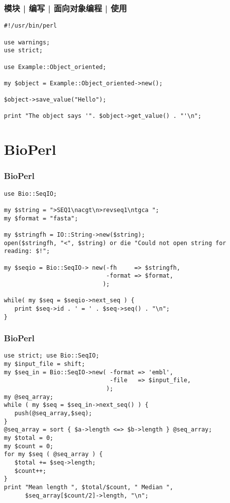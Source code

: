 \begin{frame}[fragile]
  \frametitle{模块 | 编写 | 面向对象编程 | 使用}
\begin{lstlisting}
#!/usr/bin/perl

use warnings;
use strict;

use Example::Object_oriented;

my $object = Example::Object_oriented->new();

$object->save_value("Hello");

print "The object says '". $object->get_value() . "'\n";
\end{lstlisting}
\end{frame}

\section{BioPerl}
\begin{frame}[fragile]
  \frametitle{BioPerl}
\begin{lstlisting}[basicstyle=\footnotesize\tt,numberstyle=\scriptsize]
use Bio::SeqIO;

my $string = ">SEQ1\nacgt\n>revseq1\ntgca "; 
my $format = "fasta";

my $stringfh = IO::String->new($string); 
open($stringfh, "<", $string) or die "Could not open string for reading: $!";

my $seqio = Bio::SeqIO-> new(-fh     => $stringfh,
                             -format => $format,
                            );

while( my $seq = $seqio->next_seq ) {
   print $seq->id . ' = ' . $seq->seq() . "\n"; 
}
\end{lstlisting}
\end{frame}

\begin{frame}[fragile]
  \frametitle{BioPerl}
\begin{lstlisting}[basicstyle=\footnotesize\tt,numberstyle=\scriptsize]
use strict; use Bio::SeqIO;
my $input_file = shift;
my $seq_in = Bio::SeqIO->new( -format => 'embl',
                              -file   => $input_file,
                             );
my @seq_array; 
while ( my $seq = $seq_in->next_seq() ) {
   push(@seq_array,$seq);
}
@seq_array = sort { $a->length <=> $b->length } @seq_array;
my $total = 0; 
my $count = 0; 
for my $seq ( @seq_array ) {
   $total += $seq->length;
   $count++;
}
print "Mean length ", $total/$count, " Median ", 
      $seq_array[$count/2]->length, "\n";
\end{lstlisting}
\end{frame}

